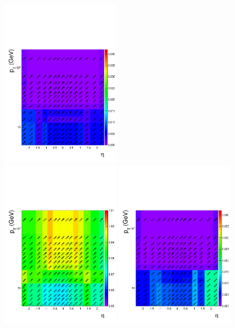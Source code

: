\begin{figure}[htbp]
\begin{center}
    \includegraphics[width=0.45\textwidth]{Figures/Muons/2017UL_SF_errors.pdf} \\
		\includegraphics[width=0.45\textwidth]{Figures/Muons/2018UL_SFs.pdf} 
		\includegraphics[width=0.45\textwidth]{Figures/Muons/2018UL_SFs_errors.pdf}

\end{center}
\end{figure}
